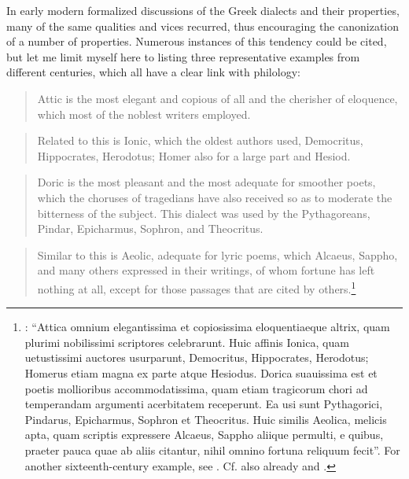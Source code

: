 In early modern formalized discussions of the Greek dialects and their properties, many of the same qualities and vices recurred, thus encouraging the canonization of a number of properties. Numerous instances of this tendency could be cited, but let me limit myself here to listing three representative examples from different centuries, which all have a clear link with philology:

\begin{quote}
Attic is the most elegant and copious of all and the cherisher of eloquence, which most of the noblest writers employed.
\end{quote}

\begin{quote}
Related to this is Ionic, which the oldest authors used, Democritus, Hippocrates, Herodotus; Homer also for a large part and Hesiod.
\end{quote}

\begin{quote}
Doric is the most pleasant and the most adequate for smoother poets, which the choruses of tragedians have also received so as to moderate the bitterness of the subject. This dialect was used by the Pythagoreans, Pindar, Epicharmus, Sophron, and Theocritus.
\end{quote}

\begin{quote}
Similar to this is Aeolic, adequate for lyric poems, which Alcaeus, Sappho, and many others expressed in their writings, of whom fortune has left nothing at all, except for those passages that are cited by others.\footnote{\citet[a.3\textsc{\textsuperscript{v}}–a.4\textsc{\textsuperscript{r}}]{Canini1555}: “Attica omnium elegantissima et copiosissima eloquentiaeque altrix, quam plurimi nobilissimi scriptores celebrarunt. Huic affinis Ionica, quam uetustissimi auctores usurparunt, Democritus, Hippocrates, Herodotus; Homerus etiam magna ex parte atque Hesiodus. Dorica suauissima est et poetis mollioribus accommodatissima, quam etiam tragicorum chori ad temperandam argumenti acerbitatem receperunt. Ea usi sunt Pythagorici, Pindarus, Epicharmus, Sophron et Theocritus. Huic similis Aeolica, melicis apta, quam scriptis expressere Alcaeus, Sappho aliique permulti, e quibus, praeter pauca quae ab aliis citantur, nihil omnino fortuna reliquum fecit”. For another sixteenth-century example, see \citet[138\textsc{\textsuperscript{v}}–139\textsc{\textsuperscript{r}}]{Vuidius1569}. Cf. also already \citet[12\textsc{\textsuperscript{v}}]{Lopad1536} and \citet[\textsc{a.6}\textsc{\textsuperscript{v}}\textsc{–a.7}\textsc{\textsuperscript{r}}]{Gessner1543}.}
\end{quote}


